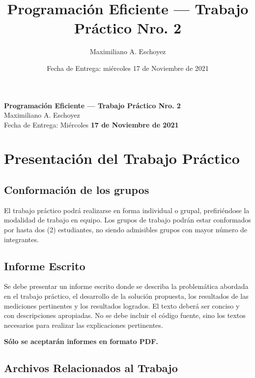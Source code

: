 \documentclass[a4paper,11pt]{article}
\title{Programación Eficiente --- Trabajo Práctico Nro. 2}
\author{Maximiliano A. Eschoyez}
\date{Fecha de Entrega: miércoles 17 de Noviembre de 2021}
\begin{document}




\begin{center}
  {\Large \textbf{Programación Eficiente --- Trabajo Práctico Nro. 2}}\\[.25cm]

  {\large Maximiliano A. Eschoyez}\\[.25cm]
  
  {Fecha de Entrega: Miércoles \textbf{17 de Noviembre de 2021}}
\end{center}

\section*{Presentación del Trabajo Práctico}

\subsection*{Conformación de los grupos}

El trabajo práctico podrá realizarse en forma individual o grupal,
prefiriéndose la modalidad de trabajo en equipo.  Los grupos de
trabajo podrán estar conformados por hasta dos (2) estudiantes, no
siendo admisibles grupos con mayor número de integrantes.


\subsection*{Informe Escrito}

Se debe presentar un informe escrito donde se describa la problemática
abordada en el trabajo práctico, el desarrollo de la solución
propuesta, los resultados de las mediciones pertinentes y los
resultados logrados.  El texto deberá ser conciso y con descripciones
apropiadas.  No se debe incluir el código fuente, sino los textos
necesarios para realizar las explicaciones pertinentes.

\textbf{Sólo se aceptarán informes en formato PDF.}


\subsection*{Archivos Relacionados al Trabajo}
\end{document}
